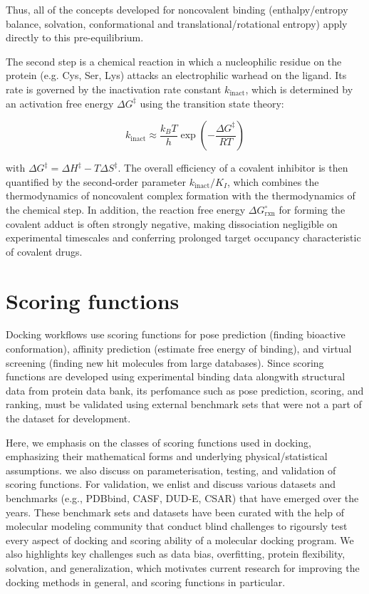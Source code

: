 \documentclass[12pt]{article}
\begin{document}
Thus, all of the concepts developed for noncovalent binding (enthalpy/entropy balance, solvation, conformational and translational/rotational entropy) apply directly to this pre-equilibrium.\cite{CH3_Strelow2017}

The second step is a chemical reaction in which a nucleophilic residue on the protein (e.g. Cys, Ser, Lys) attacks an electrophilic warhead on the ligand. Its rate is governed by the inactivation rate constant $k_{\text{inact}}$, which is determined by an activation free energy $\Delta G^\ddagger$ using the transition state theory:\cite{CH3_Schramm2011}

\begin{equation}
k_{\text{inact}} \approx \frac{k_B T}{h} \exp\!\left(-\frac{\Delta G^\ddagger}{RT}\right)
\label{eq:covbind_eq3}
\end{equation}

with $\Delta G^\ddagger = \Delta H^\ddagger - T \Delta S^\ddagger$. The overall efficiency of a covalent inhibitor is then quantified by the second-order parameter $k_{\text{inact}}/K_I$, which combines the thermodynamics of noncovalent complex formation with the thermodynamics of the chemical step.\cite{CH3_Strelow2017} In addition, the reaction free energy $\Delta G^\circ_{\text{rxn}}$ for forming the covalent adduct is often strongly negative, making dissociation negligible on experimental timescales and conferring prolonged target occupancy characteristic of covalent drugs.


\section{Scoring functions}

Docking workflows use scoring functions for pose prediction (finding bioactive conformation), affinity prediction (estimate free energy of binding), and virtual screening (finding new hit molecules from large databases). Since scoring functions are developed using experimental binding data alongwith structural data from protein data bank, its perfomance such as pose prediction, scoring, and ranking, must be validated using external benchmark sets that were not a part of the dataset for development.\cite{CH3_Su2019_CASF2016,CH3_Wang2014_CASF2013_Set,CH3_Wang2014_CASF2013_Results} 

Here, we emphasis on the classes of scoring functions used in docking, emphasizing their mathematical forms and underlying physical/statistical assumptions. we also discuss on parameterisation, testing, and validation of scoring functions. For validation, we enlist and discuss various datasets and benchmarks (e.g., PDBbind, CASF, DUD-E, CSAR) that have emerged over the years. These benchmark sets and datasets have been curated with the help of molecular modeling community that conduct blind challenges to rigoursly test every aspect of docking and scoring ability of a molecular docking program. We also highlights key challenges such as data bias, overfitting, protein flexibility, solvation, and generalization, 
which motivates current research for improving the docking methods in general, and scoring functions in particular.\cite{CH3_Wang2017} 
\end{document}
